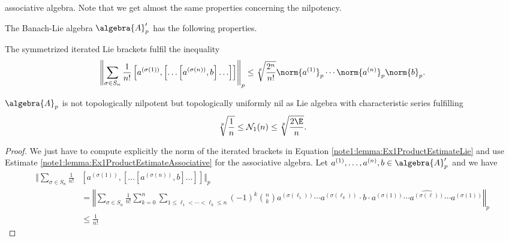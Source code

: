 \documentclass[
11pt,                          %
english                        %
]{article}
\begin{document}
associative algebra. Note that we get almost the same properties concerning the 
nilpotency.
\begin{lemma}
	The Banach-Lie algebra $\algebra{A}'_p$ has the following properties.
	\begin{lemmalist}
		\item
		The symmetrized iterated Lie brackets fulfil the inequality
		\begin{equation}
			\label{note1:lemma:Ex1ProductEstimateLie}
			\left\Vert
				\sum\limits_{\sigma \in S_n}
				\frac{1}{n!}
				\left[a^{(\sigma(1))}, 
					\left[
						\ldots 
						\left[a^{(\sigma(n))}, b \right]
						\ldots 
					\right]
				\right]
			\right\Vert_p
			\leq
			\sqrt[p]{\frac{2^n}{n!}}
			\norm{a^{(1)}}_p \cdots \norm{a^{(n)}}_p \norm{b}_p.
		\end{equation}
		
		\item
		$\algebra{A}_p$ is not topologically nilpotent but topologically uniformly 
		nil as Lie algebra with characteristic series fulfilling
		\begin{equation}
			\label{note1:lemma:Ex1NilpotencyLie}
			\sqrt[p]{\frac{1}{n}} 
			\leq 
			\mathcal{N}_1(n) 
			\leq 
			\sqrt[p]{\frac{2 \E}{n}}.
		\end{equation}	
	\end{lemmalist}
\end{lemma}
\begin{proof}
	We just have to compute explicitly the norm of the iterated brackets in 
	Equation \eqref{note1:lemma:Ex1ProductEstimateLie} and use Estimate 
	\eqref{note1:lemma:Ex1ProductEstimateAssociative} for the associative algebra.
	Let $a^{(1)}, \ldots, a^{(n)}, b \in \algebra{A}'_p$ and we have
	\begin{align*}
		\Bigg\Vert
			\sum\limits_{\sigma \in S_n}
			\frac{1}{n!}
		&
			\left[a^{(\sigma(1))}, 
				\left[
					\ldots 
					\left[a^{(\sigma(n))}, b \right]
					\ldots 
				\right]
			\right]
		\Bigg\Vert_p
		\\
		&=
		\left\Vert
			\sum\limits_{\sigma \in S_n}
			\frac{1}{n!}
			\sum\limits_{k = 0}^n
			\sum\limits_{1 \leq \ell_1 < \cdots < \ell_k \leq n}
			(-1)^k
			\binom{n}{k}
			a^{(\sigma(\ell_1))}
			\cdots
			a^{(\sigma(\ell_k))}
			\cdot b \cdot
			a^{(\sigma(1))}
			\cdots
			\widehat{a^{(\sigma(\ell))}}
			\cdots
			a^{(\sigma(1))}
		\right\Vert_p
		\\
		& \leq
		\frac{1}{n!}
	\end{align*}
\end{proof}
\end{document}
